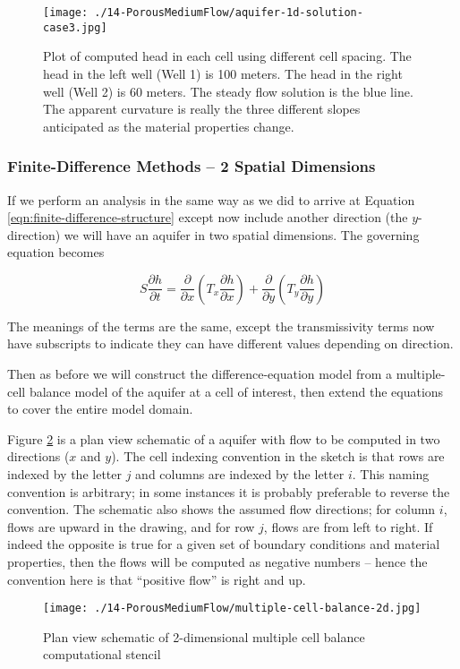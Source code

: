 \begin{figure}[h!] %
   \centering
   \texttt{[image: ./14-PorousMediumFlow/aquifer-1d-solution-case3.jpg]} 
   \caption{Plot of computed head in each cell using different cell spacing.   The head in the left well (Well 1) is 100 meters.   The head in the right well (Well 2) is 60 meters.  The steady flow solution is the blue line.  The apparent curvature is really the three different slopes anticipated as the material properties change.}
   \label{fig:aquifer-1d-solution-case3}
\end{figure}
\subsubsection{Finite-Difference Methods -- 2 Spatial Dimensions}
If we perform an analysis in the same way as we did to arrive at Equation \ref{eqn:finite-difference-structure} except now include another direction (the $y$-direction) we will have an aquifer in two spatial dimensions.  The governing equation becomes
  
\begin{equation}
S \frac{\partial h}{\partial t} = 
\frac{\partial}{\partial x}({T_x \frac{\partial h}{\partial x}})
+
\frac{\partial}{\partial y}({T_y \frac{\partial h}{\partial y}})
\end{equation}

The meanings of the terms are the same, except the transmissivity terms now have subscripts to indicate they can have different values depending on direction.

Then as before we will construct the difference-equation model from a multiple-cell balance model of the aquifer at a cell of interest, then extend the equations to cover the entire model domain.

Figure \ref{fig:multiple-cell-balance-2d} is a plan view schematic of a aquifer with flow to be computed in two directions ($x$ and $y$).   The cell indexing convention in the sketch is that rows are indexed by the letter $j$ and columns are indexed by the letter $i$.  This naming convention is arbitrary; in some instances it is probably preferable to reverse the convention.
The schematic also shows the assumed flow directions; for column $i$, flows are upward in the drawing, and for row $j$, flows are from left to right.  If indeed the opposite is true for a given set of boundary conditions and material properties, then the flows will be computed as negative numbers -- hence the convention here is that ``positive flow'' is right and up.  
\begin{figure}[h!] %
   \centering
   \texttt{[image: ./14-PorousMediumFlow/multiple-cell-balance-2d.jpg]} 
   \caption{Plan view schematic of 2-dimensional multiple cell balance computational stencil}
   \label{fig:multiple-cell-balance-2d}
\end{figure}

